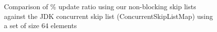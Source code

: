 \begin{figure}
\begin{center}
	\end{center}
	\caption{Comparison of \% update ratio using our non-blocking skip lists against the JDK concurrent skip list (ConcurrentSkipListMap) using a set of size 64 elements}
\end{figure}


